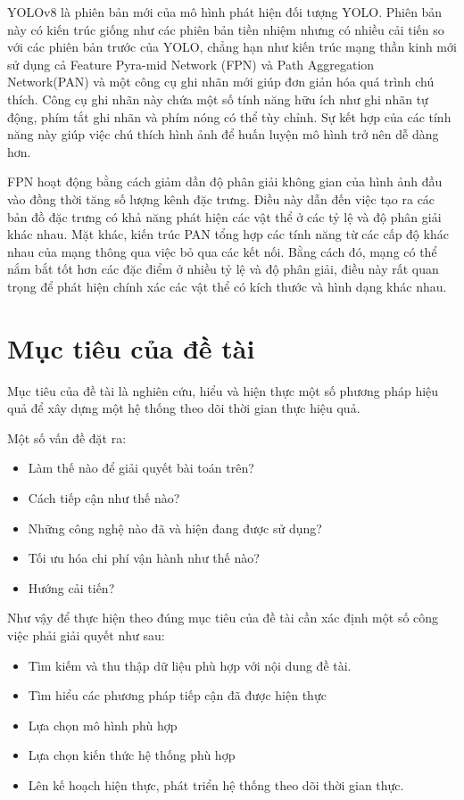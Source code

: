 YOLOv8 là phiên bản mới của mô hình phát hiện đối tượng YOLO. Phiên bản này có kiến trúc giống như các phiên bản tiền nhiệm nhưng có nhiều cải tiến so với các phiên bản trước của YOLO, chẳng hạn như kiến
trúc mạng thần kinh mới sử dụng cả Feature Pyra-mid Network (FPN) và Path Aggregation Network(PAN) và một công cụ ghi nhãn mới giúp đơn giản hóa quá trình chú thích. Công cụ ghi nhãn này chứa một số tính năng hữu ích
như ghi nhãn tự động, phím tắt ghi nhãn và phím nóng có thể tùy chỉnh. Sự kết hợp của các tính năng này giúp việc chú thích hình ảnh để huấn luyện mô hình trở nên dễ dàng hơn.\cite{Yolofly}
 
FPN hoạt động bằng cách giảm dần độ phân 
giải không gian của hình ảnh đầu vào đồng thời tăng số lượng kênh đặc trưng. Điều này dẫn đến việc tạo ra các bản đồ đặc trưng có khả năng phát hiện các vật thể ở các tỷ lệ và độ phân giải khác nhau. Mặt khác, kiến trúc
PAN tổng hợp các tính năng từ các cấp độ khác nhau của mạng thông qua việc bỏ qua các kết nối. Bằng cách đó, mạng có thể nắm bắt tốt hơn các đặc điểm ở nhiều tỷ lệ và độ phân giải, điều này rất quan trọng để phát hiện 
chính xác các vật thể có kích thước và hình dạng khác nhau.


\section{Mục tiêu của đề tài}
Mục tiêu của đề tài là nghiên cứu, hiểu và hiện thực một số phương pháp hiệu quả để xây dựng một hệ thống theo dõi thời gian thực hiệu quả. 

Một số vấn đề đặt ra: 
\begin{itemize}
\item Làm thế nào để giải quyết bài toán trên?
\item Cách tiếp cận như thế nào?
\item Những công nghệ nào đã và hiện đang được sử dụng?
\item Tối ưu hóa chi phí vận hành như thế nào?
\item Hướng cải tiến?
\end{itemize}

Như vậy để thực hiện theo đúng mục tiêu của đề tài cần xác định một số công việc phải giải quyết như sau:
\begin{itemize}
\item Tìm kiếm và thu thập dữ liệu phù hợp với nội dung đề tài.
\item Tìm hiểu các phương pháp tiếp cận đã được hiện thực
\item Lựa chọn mô hình phù hợp
\item Lựa chọn kiến thức hệ thống phù hợp
\item Lên kế hoạch hiện thực, phát triển hệ thống theo dõi thời gian thực.
\end{itemize}

